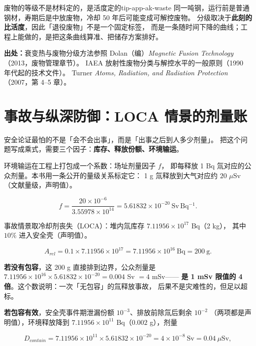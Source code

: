 \begin{tip}{废物的等级不是材料定的，是活度定的}{tip-app-ak-waste}
同一吨钢，运行前是普通钢材，寿期后是中放废物，冷却 50 年后可能变成可解控废物。
分级取决于\textbf{此刻的比活度}，因此「退役废物」不是一个固定标签，
而是一条随时间下降的曲线；工程上能做的，是把这条曲线算准、把储存方案排好。
\end{tip}

{\footnotesize
\textbf{出处：}衰变热与废物分级方法参照 Dolan（编）\emph{Magnetic Fusion Technology}（2013，废物管理章节）。
IAEA 放射性废物分类与解控水平的一般原则（1990 年代起的技术文件）。
Turner \emph{Atoms, Radiation, and Radiation Protection}（2007，第 4--5 章）。
}

\section{事故与纵深防御：LOCA 情景的剂量账}
\label{sec:app-ak-accident}

安全论证最怕的不是「会不会出事」，而是「出事之后到人多少剂量」。
把这个问题写成乘式，需要三个因子：\textbf{库存、释放份额、环境输运}。

环境输运在工程上打包成一个系数：场址剂量因子 $f$，
即每释放 1 Bq 氚对应的公众剂量。本书用一条公开的量级关系标定它：
1 g 氚释放到大气对应约 $20$ $\mu$Sv（文献量级，声明值）。

\begin{equation}
f=\frac{20\times10^{-6}}{3.55978\times10^{14}}=5.61832\times10^{-20}\ \mathrm{Sv\,Bq^{-1}}.
\label{eq:app-ak-site}
\end{equation}

事故情景取冷却剂丧失（LOCA）：堆内氚库存 $7.11956\times10^{17}$ Bq（2 kg），
其中 $10\%$ 进入安全壳（声明值）。

\begin{equation}
A_{rel}=0.1\times7.11956\times10^{17}=7.11956\times10^{16}\ \mathrm{Bq}=200\ \mathrm{g}.
\label{eq:app-ak-release}
\end{equation}

\textbf{若没有包容}，这 200 g 直接排到边界，公众剂量是
$7.11956\times10^{16}\times5.61832\times10^{-20}=0.004$ Sv $=4$ mSv——
\textbf{是 1 mSv 限值的 4 倍}。这个数说明：一次「无包容」的氚释放事故，
后果不是灾难性的，但足以超标。

\textbf{若包容有效}，安全壳事件期泄漏份额 $10^{-3}$、排放前除氚后剩余 $10^{-2}$
（两项都是声明值），环境释放降到 $7.11956\times10^{11}$ Bq（$0.002$ g），剂量

\begin{equation}
D_{contain}=7.11956\times10^{11}\times5.61832\times10^{-20}
=4\times10^{-8}\ \mathrm{Sv}=0.04\ \mu\mathrm{Sv},
\label{eq:app-ak-margin}
\end{equation}

